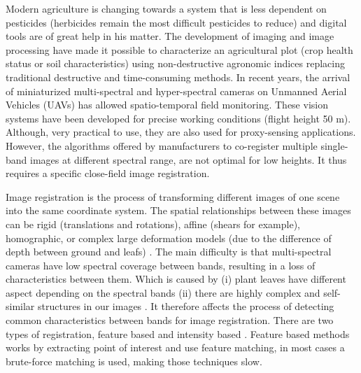 \documentclass[a4paper,twoside]{article}
\begin{document}
	\par Modern agriculture is changing towards a system that is less dependent on pesticides \cite{10.1371/journal.pone.0097922}
	(herbicides remain the most difficult pesticides to reduce) and digital tools are of great help in his matter.
	The development of imaging and image processing have made it possible to characterize an agricultural plot \cite{SANKARAN2015112}
	(crop health status or soil characteristics) using non-destructive agronomic indices \cite{doi:10.1080/02757259509532298}
	replacing traditional destructive and time-consuming methods.
	In recent years, the arrival of miniaturized multi-spectral and hyper-spectral cameras on Unmanned Aerial Vehicles (UAVs)
	has allowed spatio-temporal field monitoring. These vision systems have been developed for precise working conditions (flight height 50 m).
	Although, very practical to use, they are also used for proxy-sensing applications.
	However, the algorithms	offered by manufacturers to co-register multiple single-band images at different spectral range,
	are not optimal for low heights. It thus requires a specific close-field image registration.
	\\
	\par Image registration is the process of transforming different images of one scene into the same coordinate system.
	The spatial relationships between these images can be rigid (translations and rotations), affine (shears for example),
	homographic, or complex large deformation models (due to the difference of depth between ground and leafs) \cite{Kamoun}.
	The main difficulty is that multi-spectral cameras have low spectral coverage between bands, resulting in a loss of characteristics between them.
	Which is caused by (i) plant leaves have different aspect depending on the spectral bands
	(ii) there are highly complex and self-similar structures in our images \cite{douarre:hal-02183837}.
	It therefore affects the process of detecting common characteristics between bands for image registration.
	There are two types of registration, feature based and intensity based \cite{Zitova}.
	Feature based methods works by extracting point of interest and use feature matching, in most cases a brute-force matching is used, making those techniques slow.
\end{document}
